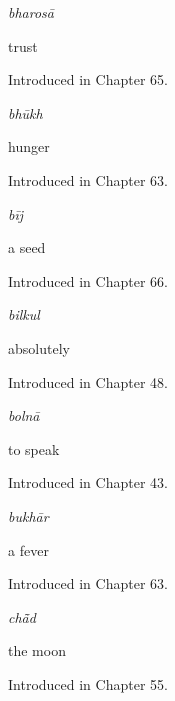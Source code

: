 \noindent\begin{minipage}[t]{\linewidth}
\raggedright
\textbf{}\enspace\emph{bharosā}\par
\small trust\par
\footnotesize Introduced in Chapter 65.
\end{minipage}\par\medskip

\noindent\begin{minipage}[t]{\linewidth}
\raggedright
\textbf{}\enspace\emph{bhūkh}\par
\small hunger\par
\footnotesize Introduced in Chapter 63.
\end{minipage}\par\medskip

\noindent\begin{minipage}[t]{\linewidth}
\raggedright
\textbf{}\enspace\emph{bīj}\par
\small a seed\par
\footnotesize Introduced in Chapter 66.
\end{minipage}\par\medskip

\noindent\begin{minipage}[t]{\linewidth}
\raggedright
\textbf{}\enspace\emph{bilkul}\par
\small absolutely\par
\footnotesize Introduced in Chapter 48.
\end{minipage}\par\medskip

\noindent\begin{minipage}[t]{\linewidth}
\raggedright
\textbf{}\enspace\emph{bolnā}\par
\small to speak\par
\footnotesize Introduced in Chapter 43.
\end{minipage}\par\medskip

\noindent\begin{minipage}[t]{\linewidth}
\raggedright
\textbf{}\enspace\emph{bukhār}\par
\small a fever\par
\footnotesize Introduced in Chapter 63.
\end{minipage}\par\medskip

\noindent\begin{minipage}[t]{\linewidth}
\raggedright
\textbf{}\enspace\emph{chā̃d}\par
\small the moon\par
\footnotesize Introduced in Chapter 55.
\end{minipage}\par\medskip

